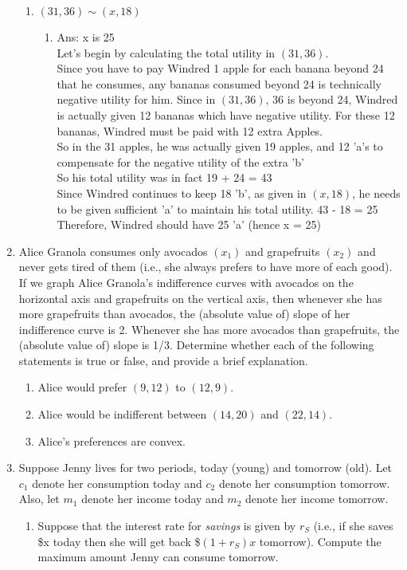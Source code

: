 \documentclass[11pt]{article}
\begin{document}
\begin{enumerate}
\begin{enumerate}
        \item $(31,36)\sim (x,18)$
        \begin{enumerate}
            \item Ans: x is 25
            \\Let's begin by calculating the total utility in $(31,36)$.
            \\Since you have to pay Windred 1 apple for each banana beyond 24 that he consumes, any bananas consumed beyond 24 is technically negative utility for him. Since in $(31,36)$, 36 is beyond 24, Windred is actually given 12 bananas which have negative utility. For these 12 bananas, Windred must be paid with 12 extra Apples.
            \\So in the 31 apples, he was actually given 19 apples, and 12 'a's to compensate for the negative utility of the extra 'b'
            \\So his total utility was in fact 19 + 24 = 43
            \\Since Windred continues to keep 18 'b', as given in $(x,18)$, he needs to be given sufficient 'a' to maintain his total utility. 43 - 18 = 25
            \\Therefore, Windred should have 25 'a' (hence x = 25)
        \end{enumerate}
    \end{enumerate}

\item Alice Granola consumes only avocados $(x_{1})$ and grapefruits $(x_{2})$ and never gets tired of them (i.e., she always prefers to have more of each good). If we graph Alice Granola’s indifference curves with avocados on the horizontal axis and grapefruits on the vertical axis, then whenever she has more grapefruits than avocados, the (absolute value of) slope of her indifference curve is 2. Whenever she has more avocados than grapefruits, the (absolute value of) slope is 1/3. Determine whether each of the following statements is true or false, and provide a brief explanation.
    \begin{enumerate}
        \item Alice would prefer $(9,12)$ to $(12,9)$.
        \item Alice would be indifferent between $(14,20)$ and $(22,14)$.
        \item Alice's preferences are convex.
    \end{enumerate}

\item Suppose Jenny lives for two periods, today (young) and tomorrow (old). Let $c_{1}$ denote her consumption today and $c_{2}$ denote her consumption tomorrow. Also, let $m_{1}$ denote her income today and $m_{2}$ denote her income tomorrow.
    \begin{enumerate}
        \item Suppose that the interest rate for \emph{savings} is given by $r_{S}$ (i.e., if she saves \$x today then she will get back \$$(1+r_{S})x$ tomorrow). Compute the maximum amount Jenny can consume tomorrow.


\end{enumerate}
\end{enumerate}
\end{document}
